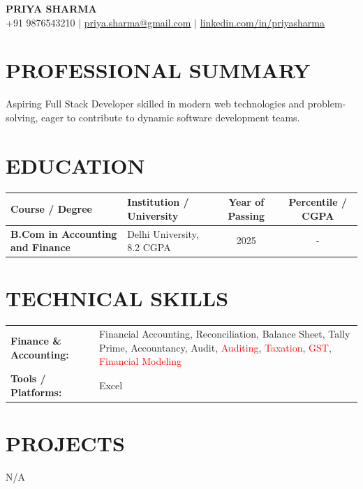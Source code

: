 \documentclass[9.5pt,a4paper]{extarticle}
\begin{document}
\begin{center}
{\Large \textbf{PRIYA SHARMA}} \\ \vspace{2pt}
+91 9876543210 \quad $|$ \quad \href{mailto:priya.sharma@gmail.com}{priya.sharma@gmail.com} \quad $|$ \quad \href{https://linkedin.com/in/priyasharma}{linkedin.com/in/priyasharma}
\end{center}

\section*{PROFESSIONAL SUMMARY}
Aspiring Full Stack Developer skilled in modern web technologies and problem-solving, eager to contribute to dynamic software development teams.

\section*{EDUCATION}
{\small
\renewcommand{\arraystretch}{1.18}
\noindent\begin{tabularx}{\textwidth}{|p{1.7in}|X|c|c|}
\hline
\textbf{Course / Degree} & \textbf{Institution / University} & \textbf{Year of Passing} & \textbf{Percentile / CGPA} \\ \hline
\textbf{B.Com in Accounting and Finance} & Delhi University, 8.2 CGPA & 2025 & - \\ \hline
\end{tabularx}
}\vspace{4pt}


\section*{TECHNICAL SKILLS}
\begin{tabular}{@{}p{2.3in}p{4.6in}@{}}
\textbf{Finance \& Accounting:} & Financial Accounting, Reconciliation, Balance Sheet, Tally Prime, Accountancy, Audit, \textcolor{red}{Auditing}, \textcolor{red}{Taxation}, \textcolor{red}{GST}, \textcolor{red}{Financial Modeling} \\
\textbf{Tools / Platforms:} & Excel \\
\end{tabular}



\section*{PROJECTS}
N/A


\end{document}
